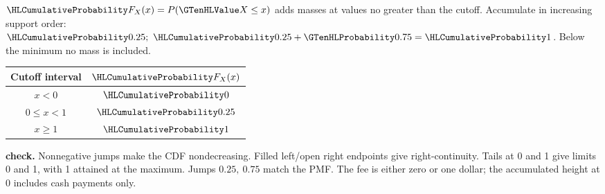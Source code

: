 $\cTwoCDFHL{F_X(x)}=P(\cTwoValue{X}\leq x)$ adds masses at values no greater than the cutoff. Accumulate in increasing support order: $\cTwoCDFHL{0.25};\ \cTwoCDFHL{0.25}+\cTwoMassHL{0.75}=\cTwoCDFHL{1}$. Below the minimum no mass is included.
\par\noindent\begin{minipage}[t]{.38\linewidth}\vspace{0pt}\centering\begin{tabular}{cc}\toprule Cutoff interval & $\cTwoCDFHL{F_X(x)}$ \\\midrule
$x<0$ & $\cTwoCDFHL{0}$ \\
$0\leq x<1$ & $\cTwoCDFHL{0.25}$ \\
$x\geq 1$ & $\cTwoCDFHL{1}$ \\
\bottomrule\end{tabular}\end{minipage}\hfill\begin{minipage}[t]{.59\linewidth}\vspace{0pt}\centering{}\end{minipage}\par
\textbf{ check.} Nonnegative jumps make the CDF nondecreasing. Filled left/open right endpoints give right-continuity. Tails at 0 and 1 give limits 0 and 1, with 1 attained at the maximum. Jumps $0.25,\ 0.75$ match the PMF. The fee is either zero or one dollar; the accumulated height at 0 includes cash payments only.

\clearpage
